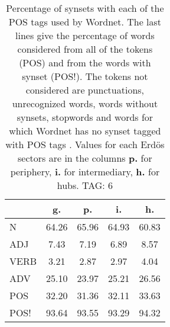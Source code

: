 \begin{table}[h!]
\begin{center}
\begin{tabular}{| l || c | c | c | c |}\hline
 & {\bf g.} & {\bf p.} & {\bf i.} & {\bf h.} \\\hline\hline
N & 64.26  & 65.96  & 64.93  & 60.83 \\\hline
ADJ & 7.43  & 7.19  & 6.89  & 8.57 \\\hline
VERB & 3.21  & 2.87  & 2.97  & 4.04 \\\hline
ADV & 25.10  & 23.97  & 25.21  & 26.56 \\\hline\hline
POS & 32.20  & 31.36  & 32.11  & 33.63 \\\hline
POS! & 93.64  & 93.55  & 93.29  & 94.32 \\\hline
\end{tabular}
\caption{Percentage of synsets with each of the POS tags used by Wordnet. The last lines give the percentage of words considered from all of the tokens (POS) and from the words with synset (POS!). The tokens not considered are punctuations, unrecognized words, words without synsets, stopwords and words for which Wordnet has no synset  tagged with POS tags . Values for each Erd\"os sectors are in the columns {{\bf p.}} for periphery, {{\bf i.}} for intermediary, {{\bf h.}} for hubs. TAG: 6}
\end{center}
\end{table}